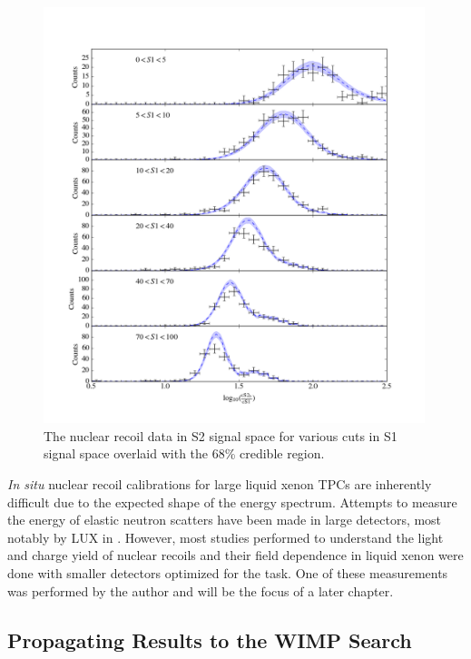 \begin{figure}[p]
	\centering
	\includegraphics[width=0.99\textwidth]{xe1t_nr_results_s2_slices}
	\caption{The nuclear recoil data in S2 signal space for various cuts in S1 signal space overlaid with the 68\% credible region.}
	\label{fig:xe1t_nr_cal_s2_slices}
\end{figure}


\textit{In situ} nuclear recoil calibrations for large liquid xenon TPCs are inherently difficult due to the expected shape of the energy spectrum.  Attempts to measure the energy of elastic neutron scatters have been made in large detectors, most notably by LUX in .  However, most studies performed to understand the light and charge yield of nuclear recoils and their field dependence in liquid xenon were done with smaller detectors optimized for the task.  One of these measurements was performed by the author and will be the focus of a later chapter.

\clearpage

\subsection{Propagating Results to the WIMP Search}
\label{sec:xe1t_propagating_results}


